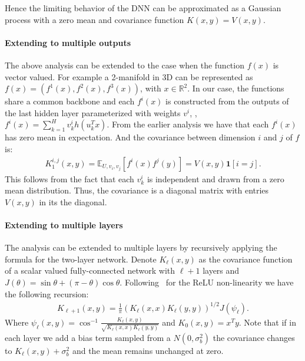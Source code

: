 Hence the limiting behavior of the DNN can be approximated as a
Gaussian process with a zero mean and covariance function $K(x,y) =
V(x,y)$.

\paragraph*{Extending to multiple outputs} The above analysis can be
extended to the case when the function $f(x)$ is vector
valued. For example a 2-manifold in 3D can be represented as $f(x) = (f^1(x), f^2(x), f^3(x))$, with $x \in \mathbb{R}^2$. 
In our case, the functions share a common backbone and each $f^i(x)$ is constructed from the outputs of the last hidden layer parameterized with
weights $v^i$, \ie, $f^i(x) = \sum_{k=1}^{H} v_k^i h(u_k^Tx).$
From the earlier analysis we have that each $f^i(x)$ has zero mean in
expectation. 
And the covariance between dimension $i$ and $j$ of $f$ is:
\begin{align*}
K_{1}^{i,j}(x,y) = \mathbb{E}_{U,v_i, v_j} \left[ f^i(x)f^j(y)\right] = V\left(x,y\right) \mathbf{1}[i=j].
\end{align*}
This follows from the fact that each $v_k^i$ is independent and drawn
from a zero mean distribution. 
Thus, the covariance is a diagonal matrix with entries $V(x,y)$ 
in its the diagonal.

\paragraph*{Extending to multiple layers}
The analysis can be extended to multiple
layers by recursively applying the formula for the two-layer network.
Denote $K_\ell(x,y)$ as the covariance function of a scalar valued
fully-connected network with $\ell+1$ layers and $J(\theta) = \sin \theta
+ (\pi-\theta) \cos \theta$. Following~\cite{cho2009kernel} for the ReLU non-linearity we have the
following recursion:
\begin{align*}
K_{\ell+1}(x,y) = \frac{1}{\pi}\left(K_{\ell}(x,x) K_{\ell}(y,y)\right)^{1/2} J\left(\psi_{\ell}\right).
\end{align*}
Where $\psi_\ell(x,y) = \cos^{-1}
\frac{K_\ell(x,y)}{\sqrt{K_\ell(x,x)K_\ell(y,y)}}$ and $K_{0}(x,y) =
x^Ty$. Note that if in each layer we add a bias term sampled from a $N(0,
\sigma_b^2)$ the covariance changes to $K_\ell(x,y)
+ \sigma_b^2$ and the mean remains unchanged at zero. 


